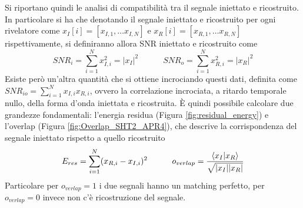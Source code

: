 Si riportano quindi le analisi di compatibilità tra il segnale iniettato e ricostruito. In particolare si ha che denotando il segnale iniettato e ricostruito per ogni rivelatore come $x_{I}[i]= [x_{I,1}, \dots x_{I,N}]$ e $x_{R}[i]= [x_{R,1}, \dots x_{R,N}]$ rispettivamente, si definiranno allora SNR iniettato e ricostruito come
\begin{equation}
SNR_i = \sum_{i=1}^{N}x_{I, i}^2 = |x_{I}|^2 \quad\quad\quad SNR_o = \sum_{i=1}^{N}x_{R, i}^2 = |x_{R}|^2
\label{eqn:iSNR_oSNR}
\end{equation} 
Esiste però un'altra quantità che si ottiene incrociando questi dati, definita come $SNR_{io} = \sum_{i=1}^{N}x_{I, i}x_{R, i}$, ovvero la correlazione incrociata, a ritardo temporale nullo, della forma d'onda iniettata e ricostruita\cite{cWB_Manual}. È quindi possibile calcolare due grandezze fondamentali: l'energia residua (Figura \ref{fig:residual_energy}) e l'overlap (Figura \ref{fig:Overlap_SHT2_APR4}), che descrive la corrispondenza del segnale iniettato rispetto a quello ricostruito
\begin{equation}
E_{res}= \sum_{i=1}^{N}(x_{R, i}-x_{I, i})^2%
\quad\quad\quad
o_{verlap} = \frac{\braket{x_I}{x_R}}{\sqrt{|x_I||x_R|}}%
\end{equation}
Particolare per $o_{verlap}=1$ i due segnali hanno un matching perfetto, per $o_{verlap}=0$ invece non c'è ricostruzione del segnale.

